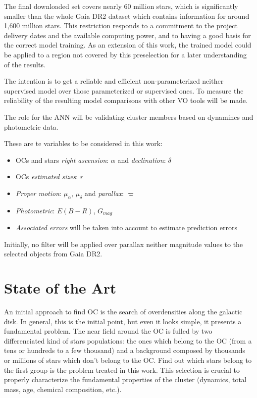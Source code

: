 \documentclass[11pt, a4paper, english]{book}
\begin{document}
The final downloaded set covers nearly 60 million stars, which is significantly smaller than the whole Gaia DR2 dataset which contains
information for around 1,600 million stars.
This restriction responds to a commitment to the project delivery dates and the available computing power,
and to having a good basis for the correct model training. As an extension of this work, the trained model could be applied to a region
not covered by this preselection for a later understanding of the results.

The intention is to get a reliable and efficient non-parameterized neither supervised model over those parameterized or supervised ones.
To measure the reliability of the resulting model comparisons with other VO tools will be made.

The role for the ANN will be validating cluster members based on dynamincs and photometric data.

These are te variables to be considered in this work:

\begin{itemize}
  \item OCs and stars \emph{right ascension}: $\alpha$ and \emph{declination}: $\delta$
  \item OCs \emph{estimated sizes}: $r$
  \item \emph{Proper motion}: $\mu_{\alpha}$, $\mu_{\delta}$ and \emph{parallax}: $\varpi$
  \item \emph{Photometric}: $E(B-R)$, $G_{mag}$
  \item \emph{Associated errors} will be taken into account to estimate prediction errors
\end{itemize}

Initially, no filter will be applied over parallax neither magnitude values to the selected objects from Gaia DR2.

\chapter{State of the Art}

An initial approach to find OC is the search of overdensities along the galactic disk. In general, this is the initial point,
but even it looks simple, it presents a fundamental problem. The near field around the OC is fulled by two differenciated
kind of stars populations: the ones which belong to the OC (from a tens or hundreds to a few thousand) and a background composed
by thousands or millions of stars which don't belong to the OC. Find out which stars belong to the first group is the problem
treated in this work. This selection is crucial to properly characterize the fundamental properties of the cluster
(dynamics, total mass, age, chemical composition, etc.).
\end{document}
